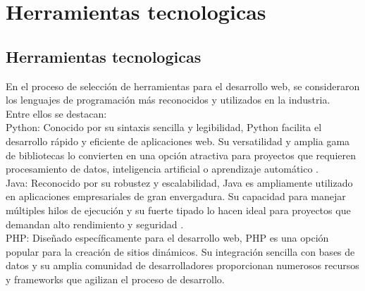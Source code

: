 \fancyhead{}
\fancyfoot{}
\cfoot{\thepage}



\chapter{Herramientas tecnologicas}
\section{Herramientas tecnologicas}
En el proceso de selección de herramientas para el desarrollo web, se consideraron los lenguajes de programación más reconocidos y utilizados en la industria. \\
Entre ellos se destacan: \\
Python: Conocido por su sintaxis sencilla y legibilidad, Python facilita el desarrollo rápido y eficiente de aplicaciones web. Su versatilidad y amplia gama de bibliotecas lo convierten en una opción atractiva para proyectos que requieren procesamiento de datos, inteligencia artificial o aprendizaje automático \cite{K}. \\
Java: Reconocido por su robustez y escalabilidad, Java es ampliamente utilizado en aplicaciones empresariales de gran envergadura. Su capacidad para manejar múltiples hilos de ejecución y su fuerte tipado lo hacen ideal para proyectos que demandan alto rendimiento y seguridad \cite{B}. \\
PHP: Diseñado específicamente para el desarrollo web, PHP es una opción popular para la creación de sitios dinámicos. Su integración sencilla con bases de datos y su amplia comunidad de desarrolladores proporcionan numerosos recursos y frameworks que agilizan el proceso de desarrollo. \cite{15} \\
